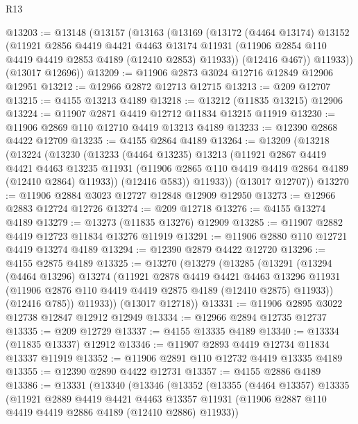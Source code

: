 \begin{lexlean}{R13}
\begin{coremodule}
@13203 := @13148
    (@13157
      (@13163
        (@13169
          (@13172
            (@4464 @13174)
            @13152
            (@11921
              @2856
              @4419
              @4421
              @4463
              @13174
              @11931
              (@11906 @2854 @110 @4419 @4419 @2853 @4189 (@12410 @2853) @11933))
            (@12416 @467))
          @11933))
      (@13017 @12696))
@13209 := @11906 @2873 @3024 @12716 @12849 @12906 @12951
@13212 := @12966 @2872 @12713 @12715
@13213 := @209 @12707
@13215 := @4155 @13213 @4189
@13218 := @13212 (@11835 @13215) @12906
@13224 := @11907 @2871 @4419 @12712 @11834 @13215 @11919
@13230 := @11906 @2869 @110 @12710 @4419 @13213 @4189
@13233 := @12390 @2868 @4422 @12709
@13235 := @4155 @2864 @4189
@13264 := @13209
    (@13218
      (@13224
        (@13230
          (@13233
            (@4464 @13235)
            @13213
            (@11921
              @2867
              @4419
              @4421
              @4463
              @13235
              @11931
              (@11906 @2865 @110 @4419 @4419 @2864 @4189 (@12410 @2864) @11933))
            (@12416 @583))
          @11933))
      (@13017 @12707))
@13270 := @11906 @2884 @3023 @12727 @12848 @12909 @12950
@13273 := @12966 @2883 @12724 @12726
@13274 := @209 @12718
@13276 := @4155 @13274 @4189
@13279 := @13273 (@11835 @13276) @12909
@13285 := @11907 @2882 @4419 @12723 @11834 @13276 @11919
@13291 := @11906 @2880 @110 @12721 @4419 @13274 @4189
@13294 := @12390 @2879 @4422 @12720
@13296 := @4155 @2875 @4189
@13325 := @13270
    (@13279
      (@13285
        (@13291
          (@13294
            (@4464 @13296)
            @13274
            (@11921
              @2878
              @4419
              @4421
              @4463
              @13296
              @11931
              (@11906 @2876 @110 @4419 @4419 @2875 @4189 (@12410 @2875) @11933))
            (@12416 @785))
          @11933))
      (@13017 @12718))
@13331 := @11906 @2895 @3022 @12738 @12847 @12912 @12949
@13334 := @12966 @2894 @12735 @12737
@13335 := @209 @12729
@13337 := @4155 @13335 @4189
@13340 := @13334 (@11835 @13337) @12912
@13346 := @11907 @2893 @4419 @12734 @11834 @13337 @11919
@13352 := @11906 @2891 @110 @12732 @4419 @13335 @4189
@13355 := @12390 @2890 @4422 @12731
@13357 := @4155 @2886 @4189
@13386 := @13331
    (@13340
      (@13346
        (@13352
          (@13355
            (@4464 @13357)
            @13335
            (@11921
              @2889
              @4419
              @4421
              @4463
              @13357
              @11931
              (@11906 @2887 @110 @4419 @4419 @2886 @4189 (@12410 @2886) @11933))

\end{coremodule}
\end{lexlean}
